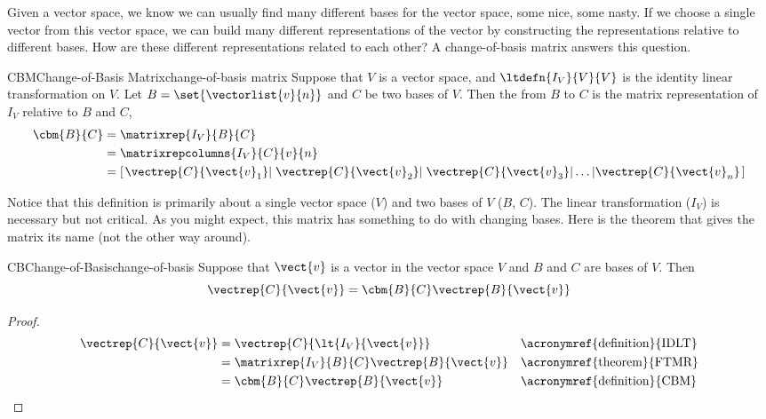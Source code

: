 %
%
%
Given a vector space, we know we can usually find many different bases for the vector space, some nice, some nasty.  If we choose a single vector from this vector space, we can build many different representations of the vector by constructing the representations relative to different bases.  How are these different representations related to each other?  A change-of-basis matrix answers this question.
%
\begin{definition}{CBM}{Change-of-Basis Matrix}{change-of-basis matrix}
Suppose that $V$ is a vector space, and $\ltdefn{I_V}{V}{V}$ is the identity linear transformation on $V$.  Let $B=\set{\vectorlist{v}{n}}$ and $C$ be two bases of $V$.  Then the  from $B$ to $C$ is the matrix representation of $I_V$ relative to $B$ and $C$,
%
\begin{align*}
\cbm{B}{C}&=\matrixrep{I_V}{B}{C}\\
&=\matrixrepcolumns{I_V}{C}{v}{n}\\
&=\left\lbrack
\left.\vectrep{C}{\vect{v}_1}\right|
\left.\vectrep{C}{\vect{v}_2}\right|
\left.\vectrep{C}{\vect{v}_3}\right|
\ldots
\left|\vectrep{C}{\vect{v}_n}\right.
\right\rbrack
\end{align*}
%
\end{definition}
%
Notice that this definition is primarily about a single vector space ($V$) and two bases of $V$ ($B$, $C$).  The linear transformation ($I_V$) is necessary but not critical.  As you might expect, this matrix has something to do with changing bases.  Here is the theorem that gives the matrix its name (not the other way around).
%
\begin{theorem}{CB}{Change-of-Basis}{change-of-basis}
Suppose that $\vect{v}$ is a vector in the vector space $V$ and $B$ and $C$ are bases of $V$.  Then
%
\begin{equation*}
\vectrep{C}{\vect{v}}=\cbm{B}{C}\vectrep{B}{\vect{v}}
\end{equation*}
%
\end{theorem}
%
\begin{proof}
%
\begin{align*}
\vectrep{C}{\vect{v}}
&=\vectrep{C}{\lt{I_V}{\vect{v}}}
&&\text{\acronymref{definition}{IDLT}}\\
%
&=\matrixrep{I_V}{B}{C}\vectrep{B}{\vect{v}}
&&\text{\acronymref{theorem}{FTMR}}\\
%
&=\cbm{B}{C}\vectrep{B}{\vect{v}}
&&\text{\acronymref{definition}{CBM}}
%
\end{align*}
%
\end{proof}

